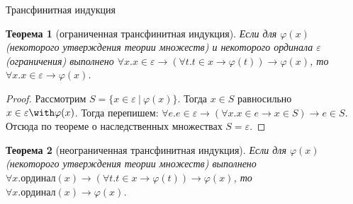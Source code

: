 \documentclass[aspectratio=169]{beamer}
\newtheorem{thm}{Теорема}[section]
\begin{document}
\begin{frame}{Трансфинитная индукция}
\begin{thm}[ограниченная трансфинитная индукция] Если для $\varphi(x)$ (некоторого утверждения
теории множеств) и некоторого ординала $\varepsilon$ (ограничения) выполнено
$\forall x.x \in \varepsilon \rightarrow (\forall t.t \in x \rightarrow \varphi(t)) \rightarrow \varphi(x)$,
то $\forall x.x \in \varepsilon \rightarrow \varphi(x)$.
\end{thm}
\begin{proof}Рассмотрим $S = \{ x\in \varepsilon\ |\ \varphi(x) \}$. Тогда $x \in S$ равносильно 
$x\in\varepsilon\with\varphi(x)$.
Тогда перепишем: $\forall e.e \in \varepsilon \rightarrow (\forall x.x \in e \rightarrow x \in S) \rightarrow e \in S$.
Отсюда по теореме о наследственных множествах $S = \varepsilon$.\end{proof}

\begin{thm}[неограниченная трансфинитная индукция] Если для $\varphi(x)$ (некоторого утверждения
теории множеств) выполнено
$\forall x.\text{ординал}(x) \rightarrow (\forall t.t \in x \rightarrow \varphi(t)) \rightarrow \varphi(x)$,
то $\forall x.\text{ординал}(x) \rightarrow \varphi(x)$.
\end{thm}


\end{frame}
\end{document}
